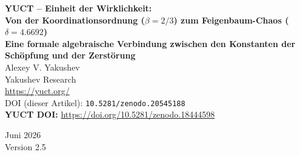 \documentclass[12pt,a4paper]{article}
\begin{document}
	
	\begin{titlepage}
		\centering
		\vspace*{2cm}
		
		{\Huge\bfseries YUCT – Einheit der Wirklichkeit:\\[0.3cm]
			Von der Koordinationsordnung (\(\beta = 2/3\)) zum Feigenbaum-Chaos (\(\delta = 4.6692\))}\\[1cm]
		
		{\Large\bfseries Eine formale algebraische Verbindung zwischen den Konstanten der Schöpfung und der Zerstörung}\\[2cm]
		
		{\large Alexey V. Yakushev}\\[0.5cm]
		{\normalsize Yakushev Research}\\[0.3cm]
		{\normalsize \url{https://yuct.org/}}\\[1.5cm]
		
		{\normalsize DOI (dieser Artikel): \texttt{10.5281/zenodo.20545188}}\\
		\vspace*{1cm}
		\textbf{YUCT DOI:} \url{https://doi.org/10.5281/zenodo.18444598}\\
		\vspace*{1cm}
		
		{\normalsize Juni 2026}\\[0.3cm]
		{\normalsize Version 2.5}\\[2cm]
	\end{titlepage}
	
\end{document}
